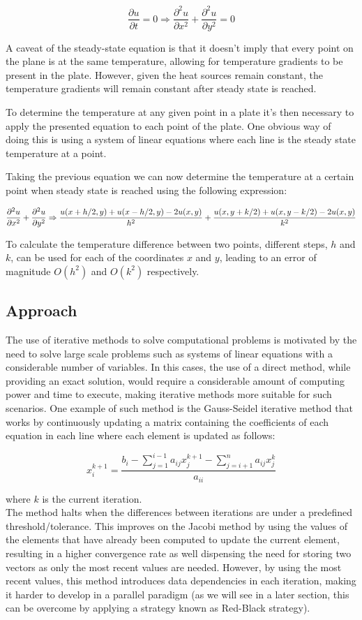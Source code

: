 \documentclass{article}
\begin{document}
$$\frac{\partial u}{\partial t} = 0 \Rightarrow \frac{\partial^2u}{\partial x^2} + \frac{\partial^2u}{\partial y^2} = 0$$

A caveat of the steady-state equation is that it doesn't imply that every point on the plane is at the same temperature, allowing for temperature gradients to be 
present in the plate. However, given the heat sources remain constant, the temperature gradients will remain constant after steady state is reached.

To determine the temperature at any given point in a plate it's then necessary to apply the presented equation to each point of the plate. One obvious way of 
doing this is using a system of linear equations where each line is the steady state temperature at a point.

Taking the previous equation we can now determine the temperature at a certain point when steady state is reached using the following expression:

$$\frac{\partial^2u}{\partial x^2} + \frac{\partial^2u}{\partial y^2} \\
\Rightarrow \frac{u(x+h/2, y) + u(x-h/2, y) - 2u(x,y)}{h^2} + \frac{u(x, y+k/2) + u(x, y-k/2) - 2u(x,y)}{k^2}$$

To calculate the temperature difference between two points, different steps, $h$ and $k$, can be used for each of the coordinates $x$ and $y$, leading to an error
of magnitude $O(h^2)$ and $O(k^2)$ respectively.


\subsection{Approach}
The use of iterative methods to solve computational problems is motivated by the need to solve large scale problems such as systems of linear equations with
a considerable number of variables. In this cases, the use of a direct method, while providing an exact solution, would require a considerable
amount of computing power and time to execute, making iterative methods more suitable for such scenarios. One example of such method is the 
Gauss-Seidel iterative method that works by continuously updating a matrix containing the coefficients of each equation in each line where each element is 
updated as follows:

$$x_i^{k+1} = \frac{b_i - \sum_{j=1}^{i-1} a_{ij}x_j^{k+1} - \sum_{j=i+1}^n a_{ij}x_j^k}{a_{ii}}$$

where $k$ is the current iteration. \\
The method halts when the differences between iterations are under a predefined threshold/tolerance. 
This improves on the Jacobi method by using the values of the elements that have already been computed to update the current element, resulting in a higher 
convergence rate as well dispensing the need for storing two vectors as only the most recent values are needed. However, by using the most recent 
values, this method introduces data dependencies in each iteration, making it harder to develop in a parallel paradigm (as we will see in a later section, 
this can be overcome by applying a strategy known as Red-Black strategy).
\end{document}
